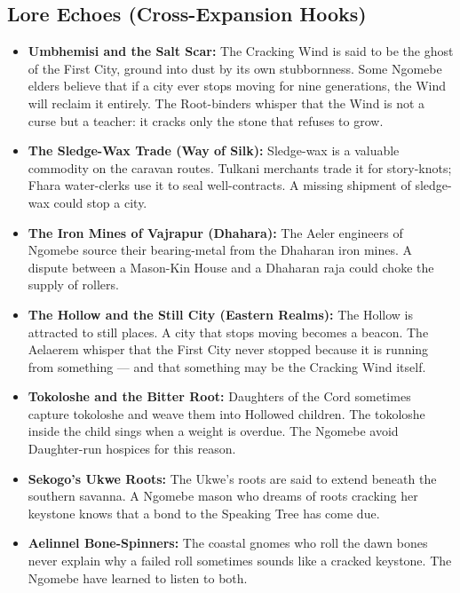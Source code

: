 \subsection*{Lore Echoes (Cross-Expansion Hooks)}
\begin{itemize}
  \item \textbf{Umbhemisi and the Salt Scar:} The Cracking Wind is said to be the ghost of the First City, ground into dust by its own stubbornness. Some Ngomebe elders believe that if a city ever stops moving for nine generations, the Wind will reclaim it entirely. The Root-binders whisper that the Wind is not a curse but a teacher: it cracks only the stone that refuses to grow.
  \item \textbf{The Sledge-Wax Trade (Way of Silk):} Sledge-wax is a valuable commodity on the caravan routes. Tulkani merchants trade it for story-knots; Fhara water-clerks use it to seal well-contracts. A missing shipment of sledge-wax could stop a city.
  \item \textbf{The Iron Mines of Vajrapur (Dhahara):} The Aeler engineers of Ngomebe source their bearing-metal from the Dhaharan iron mines. A dispute between a Mason-Kin House and a Dhaharan raja could choke the supply of rollers.
  \item \textbf{The Hollow and the Still City (Eastern Realms):} The Hollow is attracted to still places. A city that stops moving becomes a beacon. The Aelaerem whisper that the First City never stopped because it is running from something --- and that something may be the Cracking Wind itself.
  \item \textbf{Tokoloshe and the Bitter Root:} Daughters of the Cord sometimes capture tokoloshe and weave them into Hollowed children. The tokoloshe inside the child sings when a weight is overdue. The Ngomebe avoid Daughter-run hospices for this reason.
  \item \textbf{Sekogo's Ukwe Roots:} The Ukwe's roots are said to extend beneath the southern savanna. A Ngomebe mason who dreams of roots cracking her keystone knows that a bond to the Speaking Tree has come due.
  \item \textbf{Aelinnel Bone-Spinners:} The coastal gnomes who roll the dawn bones never explain why a failed roll sometimes sounds like a cracked keystone. The Ngomebe have learned to listen to both.
\end{itemize}

